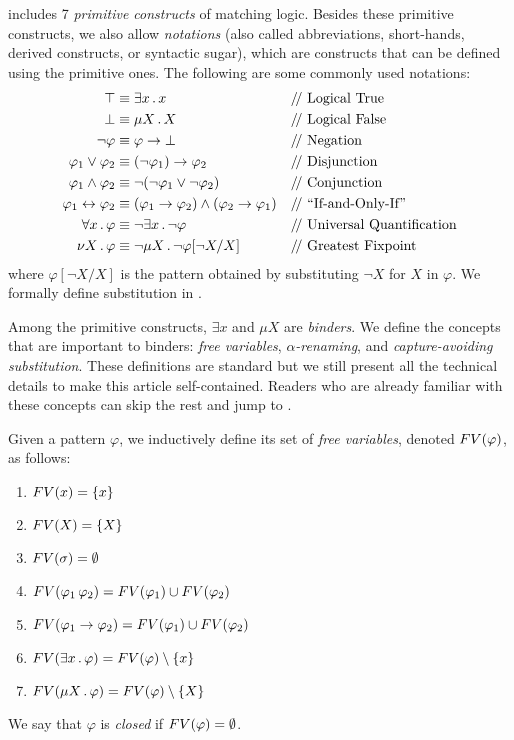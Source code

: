 \documentclass{article}
\begin{document}
 includes 7 \emph{primitive constructs} of matching logic.
Besides these primitive constructs, we also allow \emph{notations}
(also called 
abbreviations, short-hands, derived constructs, or syntactic sugar),
which are constructs that can be defined using the primitive ones. 
The following are some commonly used notations:
\begin{align}
\top 
&\equiv \exists x \ld x
&&\text{\Slash Logical True}
\\
\bot 
&\equiv \mu X \ld X
&&\text{\Slash Logical False}
\\
\neg \varphi 
&\equiv \varphi \imp \bot
&&\text{\Slash Negation}
\\
\varphi_1 \lor \varphi_2
&\equiv (\neg \varphi_1) \imp \varphi_2
&&\text{\Slash Disjunction}
\\
\varphi_1 \land \varphi_2
&\equiv \neg(\neg \varphi_1 \lor \neg \varphi_2)
&&\text{\Slash Conjunction}
\\
\varphi_1 \dimp \varphi_2
&\equiv (\varphi_1 \imp \varphi_2) \land (\varphi_2 \imp \varphi_1)
&&\text{\Slash ``If-and-Only-If''}
\\
\forall x \ld \varphi
&\equiv \neg \exists x \ld \neg \varphi
&&\text{\Slash Universal Quantification}
\\
\nu X \ld \varphi
&\equiv \neg \mu X \ld \neg \varphi[\neg X / X]
&&\text{\Slash Greatest Fixpoint}
\end{align}
where $\varphi[\neg X / X]$ is the pattern obtained by
substituting $\neg X$ for $X$ in $\varphi$. 
We formally define substitution in . 



Among the primitive constructs, $\exists x$ and $\mu X$ are \emph{binders}. 
We define the concepts that are important to binders:
\emph{free variables}, \emph{$\alpha$-renaming}, and
\emph{capture-avoiding substitution}.
These definitions are standard
but we still present all the technical details to make this article
self-contained. 
Readers who are already familiar with these concepts can skip
the rest and jump to . 

\begin{definition}
Given a pattern $\varphi$,
we inductively
define its set of \emph{free variables}, denoted $FV(\varphi)$, as follows:
\begin{enumerate}
\item $FV(x) = \{x\}$
\item $FV(X) = \{X\}$
\item $FV(\sigma) = \emptyset$
\item $FV(\varphi_1 \, \varphi_2) = FV(\varphi_1) \cup FV(\varphi_2)$
\item $FV(\varphi_1 \to \varphi_2) = FV(\varphi_1) \cup FV(\varphi_2)$
\item $FV(\exists x \,.\, \varphi) = FV(\varphi) \setminus \{x\}$
\item $FV(\mu X \,.\, \varphi) = FV(\varphi) \setminus \{X\}$
\end{enumerate}
We say that $\varphi$ is \emph{closed} if $FV(\varphi) = \emptyset$. 
\end{definition}
\end{document}
